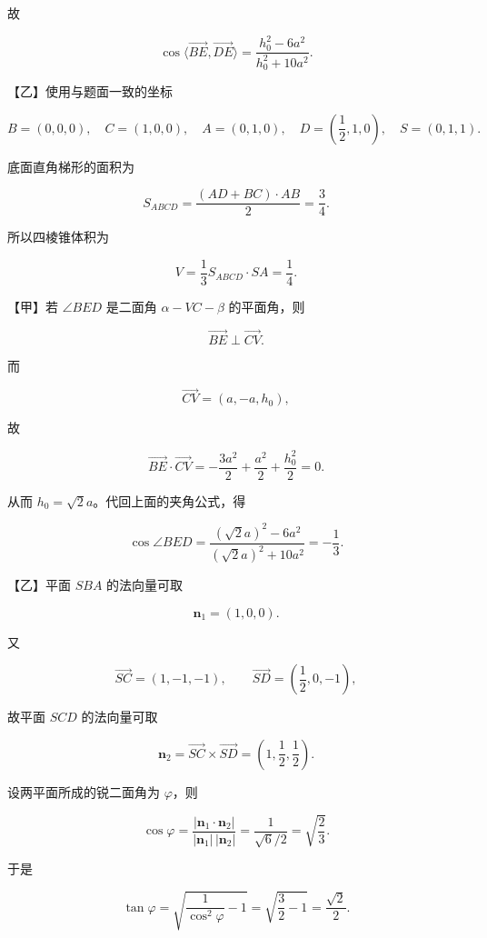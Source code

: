 \begin{answer}
故

\nopagebreak[4]
\[
\cos\langle\overrightarrow{BE},\overrightarrow{DE}\rangle
=\frac{h_0^2-6a^2}{h_0^2+10a^2}.
\]

【乙】使用与题面一致的坐标

\nopagebreak[4]
\[
B=(0,0,0),\quad C=(1,0,0),\quad A=(0,1,0),\quad
D=\left(\frac12,1,0\right),\quad S=(0,1,1).
\]

底面直角梯形的面积为

\nopagebreak[4]
\[
S_{ABCD}=\frac{(AD+BC)\cdot AB}{2}
=\frac34.
\]

所以四棱锥体积为

\nopagebreak[4]
\[
V=\frac13S_{ABCD}\cdot SA=\frac14.
\]


【甲】若 $\angle BED$ 是二面角 $\alpha-VC-\beta$ 的平面角，则

\nopagebreak[4]
\[
\overrightarrow{BE}\perp\overrightarrow{CV}.
\]

而

\nopagebreak[4]
\[
\overrightarrow{CV}=(a,-a,h_0),
\]

故

\nopagebreak[4]
\[
\overrightarrow{BE}\cdot\overrightarrow{CV}
=-\frac{3a^2}{2}+\frac{a^2}{2}+\frac{h_0^2}{2}=0.
\]

从而 $h_0=\sqrt2a$。代回上面的夹角公式，得

\nopagebreak[4]
\[
\cos\angle BED
=\frac{(\sqrt2a)^2-6a^2}{(\sqrt2a)^2+10a^2}
=-\frac13.
\]

【乙】平面 $SBA$ 的法向量可取

\nopagebreak[4]
\[
\boldsymbol n_1=(1,0,0).
\]

又

\nopagebreak[4]
\[
\overrightarrow{SC}=(1,-1,-1),\qquad
\overrightarrow{SD}=\left(\frac12,0,-1\right),
\]

故平面 $SCD$ 的法向量可取

\nopagebreak[4]
\[
\boldsymbol n_2=\overrightarrow{SC}\times\overrightarrow{SD}
=\left(1,\frac12,\frac12\right).
\]

设两平面所成的锐二面角为 $\varphi$，则

\nopagebreak[4]
\[
\cos\varphi
=\frac{|\boldsymbol n_1\cdot\boldsymbol n_2|}
{|\boldsymbol n_1|\,|\boldsymbol n_2|}
=\frac1{\sqrt6/2}
=\sqrt{\frac23}.
\]

于是

\nopagebreak[4]
\[
\tan\varphi
=\sqrt{\frac1{\cos^2\varphi}-1}
=\sqrt{\frac32-1}
=\frac{\sqrt2}{2}.
\]



\end{answer}
